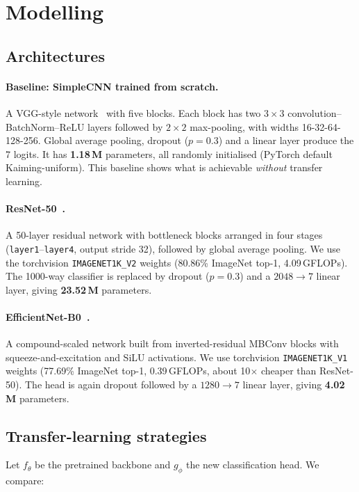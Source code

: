 \section{Modelling}
\label{sec:modeling}

\subsection{Architectures}

\paragraph{Baseline: SimpleCNN trained from scratch.} A VGG-style network~\cite{vgg} with five blocks. Each
block has two $3\times3$ convolution--BatchNorm--ReLU layers followed by $2\times2$ max-pooling, with widths
16-32-64-128-256. Global average pooling, dropout ($p=0.3$) and a linear layer produce the 7 logits. It has
\textbf{1.18\,M} parameters, all randomly initialised (PyTorch default Kaiming-uniform). This baseline shows what is achievable
\emph{without} transfer learning.

\paragraph{ResNet-50~\cite{resnet}.} A 50-layer residual network with bottleneck blocks arranged in four stages
(\texttt{layer1}--\texttt{layer4}, output stride 32), followed by global average pooling. We use the torchvision
\texttt{IMAGENET1K\_V2} weights (80.86\% ImageNet top-1, 4.09\,GFLOPs). The 1000-way classifier is replaced by
dropout ($p=0.3$) and a $2048\to7$ linear layer, giving \textbf{23.52\,M} parameters.

\paragraph{EfficientNet-B0~\cite{efficientnet}.} A compound-scaled network built from inverted-residual MBConv
blocks with squeeze-and-excitation and SiLU activations. We use torchvision \texttt{IMAGENET1K\_V1} weights
(77.69\% ImageNet top-1, 0.39\,GFLOPs, about 10$\times$ cheaper than ResNet-50). The head is again dropout
followed by a $1280\to7$ linear layer, giving \textbf{4.02\,M} parameters.

\subsection{Transfer-learning strategies}
Let $f_\theta$ be the pretrained backbone and $g_\phi$ the new classification head. We compare:

